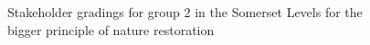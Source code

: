 \documentclass[
  12pt,
  letterpaper,
  DIV=11,
  numbers=noendperiod]{scrartcl}
\begin{document}
\begin{figure}[H]


\caption{\label{fig-SomBigG2}Stakeholder gradings for group 2 in the
Somerset Levels for the bigger principle of nature restoration}

\end{figure}%
\end{document}
